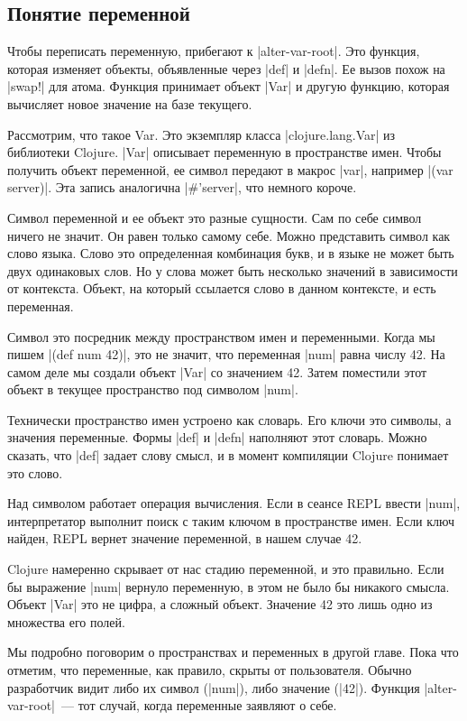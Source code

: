 \subsection{Понятие переменной}

Чтобы переписать переменную, прибегают к \spverb|alter-var-root|. Это функция, которая
изменяет объекты, объявленные через \spverb|def| и \spverb|defn|. Ее вызов похож на \spverb|swap!|
для атома. Функция принимает объект \spverb|Var| и другую функцию, которая вычисляет
новое значение на базе текущего.

Рассмотрим, что такое Var. Это экземпляр класса \spverb|clojure.lang.Var| из библиотеки
Clojure. \spverb|Var| описывает переменную в пространстве имен. Чтобы получить объект
переменной, ее символ передают в макрос \spverb|var|, например \spverb|(var server)|. Эта
запись аналогична \spverb|#'server|, что немного короче.

Символ переменной и ее объект это разные сущности. Сам по себе символ ничего не
значит. Он равен только самому себе. Можно представить символ как слово
языка. Слово это определенная комбинация букв, и в языке не может быть двух
одинаковых слов. Но у слова может быть несколько значений в зависимости от
контекста. Объект, на который ссылается слово в данном контексте, и есть
переменная.

Символ это посредник между пространством имен и переменными. Когда мы пишем
\spverb|(def num 42)|, это не значит, что переменная \spverb|num| равна числу 42. На самом
деле мы создали объект \spverb|Var| со значением 42. Затем поместили этот объект в
текущее пространство под символом \spverb|num|.

Технически пространство имен устроено как словарь. Его ключи это символы, а
значения переменные. Формы \spverb|def| и \spverb|defn| наполняют этот словарь. Можно сказать,
что \spverb|def| задает слову смысл, и в момент компиляции Clojure понимает это слово.

Над символом работает операция вычисления. Если в сеансе REPL ввести \spverb|num|,
интерпретатор выполнит поиск с таким ключом в пространстве имен. Если ключ
найден, REPL вернет значение переменной, в нашем случае 42.

Clojure намеренно скрывает от нас стадию переменной, и это правильно. Если бы
выражение \spverb|num| вернуло переменную, в этом не было бы никакого смысла. Объект
\spverb|Var| это не цифра, а сложный объект. Значение 42 это лишь одно из множества его
полей.

Мы подробно поговорим о пространствах и переменных в другой главе. Пока что
отметим, что переменные, как правило, скрыты от пользователя. Обычно разработчик
видит либо их символ (\spverb|num|), либо значение (\spverb|42|). Функция \spverb|alter-var-root|~---
тот случай, когда переменные заявляют о себе.

